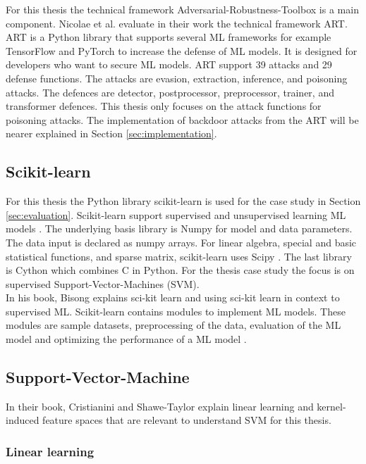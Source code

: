 For this thesis the technical framework Adversarial-Robustness-Toolbox \cite{art2018} is a main component. Nicolae et al. \cite{DBLP:journals/corr/abs-1807-01069} evaluate in their work
the technical framework ART. ART is a Python library that supports several ML frameworks for example TensorFlow and PyTorch to increase the defense of ML models. It is designed for developers who want to secure ML models. ART support 39 attacks and 29 defense functions. The attacks are evasion, extraction, inference, and poisoning attacks. The defences are detector, postprocessor, preprocessor, trainer, and transformer defences. This thesis only focuses on the attack functions for poisoning attacks. The implementation of backdoor attacks from the ART will be nearer explained in Section \ref{sec:implementation}.

\subsection{Scikit-learn}

For this thesis the Python library scikit-learn is used for the case study in Section \ref{sec:evaluation}. Scikit-learn support supervised and unsupervised learning ML models \cite{scikit-learn}. The underlying basis library is Numpy for model and data parameters. The data input is declared as numpy arrays. \cite{harris2020array} For linear algebra, special and basic statistical functions, and sparse matrix, scikit-learn uses Scipy \cite{2020SciPy-NMeth}. The last library is Cython \cite{behnel2011cython} which combines C in Python. For the thesis case study the focus is on supervised Support-Vector-Machines (SVM). \\
In his book, Bisong \cite{Bisong_2019} explains sci-kit learn and using sci-kit learn in context to supervised ML. Scikit-learn contains modules to implement ML models. These modules are sample datasets, preprocessing of the data, evaluation of the ML model and optimizing the performance of a ML model \cite{sklearn_api}.

\subsection{Support-Vector-Machine}

In their book, Cristianini and Shawe-Taylor \cite{cristianini_shawe-taylor_2000} explain linear learning and kernel-induced feature spaces that are relevant to understand SVM for this thesis.

\subsubsection*{Linear learning}


